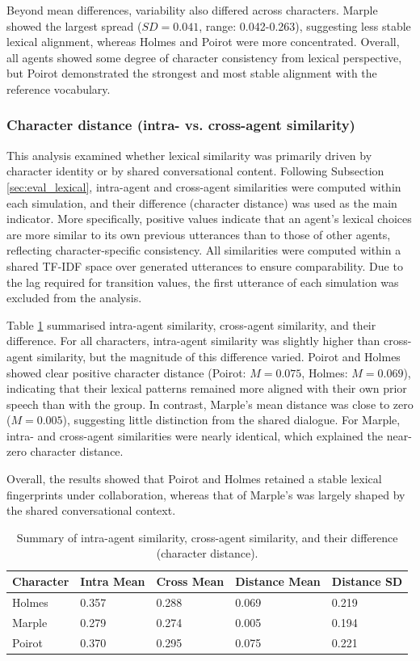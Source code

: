 \documentclass{article}
\begin{document}
Beyond mean differences, variability also differed across characters. Marple showed the largest spread ($SD=0.041$, range: 0.042-0.263), suggesting less stable lexical alignment, whereas Holmes and Poirot were more concentrated. Overall, all agents showed some degree of character consistency from lexical perspective, but Poirot demonstrated the strongest and most stable alignment with the reference vocabulary.

\subsubsection{Character distance (intra- vs. cross-agent similarity)}  \label{sec:results_lexical_chardistance}

This analysis examined whether lexical similarity was primarily driven by character identity or by shared conversational content. Following Subsection \ref{sec:eval_lexical}, intra-agent and cross-agent similarities were computed within each simulation, and their difference (character distance) was used as the main indicator. More specifically, positive values indicate that an agent's lexical choices are more similar to its own previous utterances than to those of other agents, reflecting character-specific consistency. All similarities were computed within a shared TF-IDF space over generated utterances to ensure comparability. Due to the lag required for transition values, the first utterance of each simulation was excluded from the analysis.

Table \ref{tab:lexical_char_distance} summarised intra-agent similarity, cross-agent similarity, and their difference. For all characters, intra-agent similarity was slightly higher than cross-agent similarity, but the magnitude of this difference varied. Poirot and Holmes showed clear positive character distance (Poirot: $M=0.075$, Holmes: $M=0.069$), indicating that their lexical patterns remained more aligned with their own prior speech than with the group. In contrast, Marple's mean distance was close to zero ($M=0.005$), suggesting little distinction from the shared dialogue. For Marple, intra- and cross-agent similarities were nearly identical, which explained the near-zero character distance.

Overall, the results showed that Poirot and Holmes retained a stable lexical fingerprints under collaboration, whereas that of Marple's was largely shaped by the shared conversational context.

\begin{table}[H]
\centering
\begin{tabular}{l l l l l}\toprule
Character & Intra Mean & Cross Mean & Distance Mean & Distance SD \\\midrule
Holmes & 0.357 & 0.288 & 0.069 & 0.219 \\
Marple & 0.279 & 0.274 & 0.005 & 0.194 \\
Poirot & 0.370 & 0.295 & 0.075 & 0.221 \\ \bottomrule
\end{tabular}
\caption{Summary of intra-agent similarity, cross-agent similarity, and their difference (character distance).}
\label{tab:lexical_char_distance}
\end{table}
\end{document}
